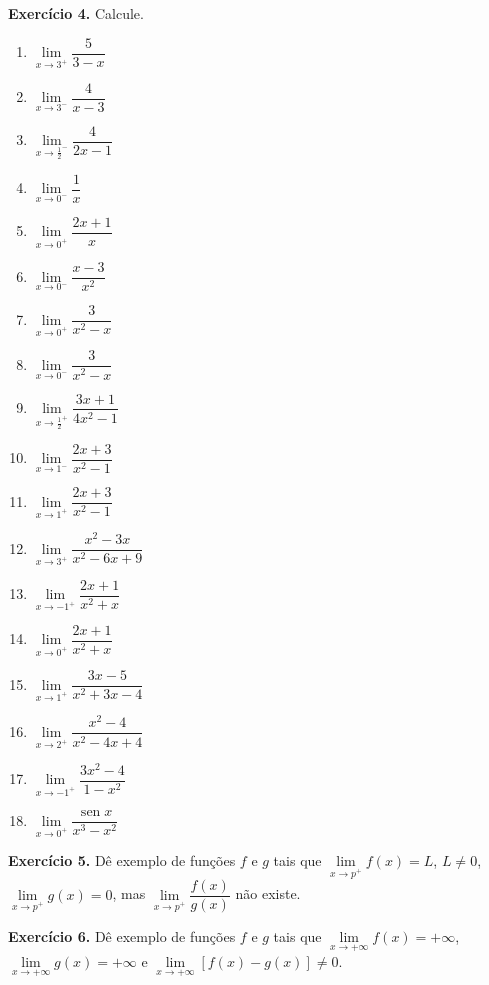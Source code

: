 \documentclass[12pt,a4paper]{article}
\begin{document}
\vspace{0.5cm}
\noindent\textbf{Exercício 4.} Calcule.
\begin{enumerate}
    \renewcommand{\theenumi}{\alph{enumi}}
    \renewcommand{\labelenumi}{\theenumi)}
    \item $\lim\limits_{x \to 3^+} \dfrac{5}{3 - x}$
    \item $\lim\limits_{x \to 3^-} \dfrac{4}{x - 3}$
    \item $\lim\limits_{x \to \frac{1}{2}^-} \dfrac{4}{2x - 1}$
    \item $\lim\limits_{x \to 0^-} \dfrac{1}{x}$
    \item $\lim\limits_{x \to 0^+} \dfrac{2x + 1}{x}$
    \item $\lim\limits_{x \to 0^-} \dfrac{x - 3}{x^2}$
    \item $\lim\limits_{x \to 0^+} \dfrac{3}{x^2 - x}$
    \item $\lim\limits_{x \to 0^-} \dfrac{3}{x^2 - x}$
    \item $\lim\limits_{x \to \frac{1}{2}^+} \dfrac{3x + 1}{4x^2 - 1}$
    \item $\lim\limits_{x \to 1^-} \dfrac{2x + 3}{x^2 - 1}$
    \item $\lim\limits_{x \to 1^+} \dfrac{2x + 3}{x^2 - 1}$
    \item $\lim\limits_{x \to 3^+} \dfrac{x^2 - 3x}{x^2 - 6x + 9}$
    \item $\lim\limits_{x \to -1^+} \dfrac{2x + 1}{x^2 + x}$
    \item $\lim\limits_{x \to 0^+} \dfrac{2x + 1}{x^2 + x}$
    \item $\lim\limits_{x \to 1^+} \dfrac{3x - 5}{x^2 + 3x - 4}$
    \item $\lim\limits_{x \to 2^+} \dfrac{x^2 - 4}{x^2 - 4x + 4}$
    \item $\lim\limits_{x \to -1^+} \dfrac{3x^2 - 4}{1 - x^2}$
    \item $\lim\limits_{x \to 0^+} \dfrac{\operatorname{sen} x}{x^3 - x^2}$
\end{enumerate}

\vspace{0.5cm}
\noindent\textbf{Exercício 5.}
Dê exemplo de funções $f$ e $g$ tais que $\lim\limits_{x \to p^+} f(x) = L$, $L \neq 0$, $\lim\limits_{x \to p^+} g(x) = 0$, mas $\lim\limits_{x \to p^+} \dfrac{f(x)}{g(x)}$ não existe.

\vspace{0.5cm}
\noindent\textbf{Exercício 6.}
Dê exemplo de funções $f$ e $g$ tais que $\lim\limits_{x \to +\infty} f(x) = +\infty$, $\lim\limits_{x \to +\infty} g(x) = +\infty$ e $\lim\limits_{x \to +\infty} [f(x) - g(x)] \neq 0$.
\end{document}
